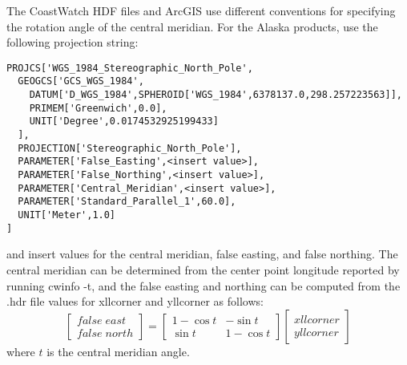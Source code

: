 The CoastWatch HDF files and ArcGIS use different conventions for
specifying the rotation angle of the central meridian.  For the Alaska
products, use the following projection string:
\begin{verbatim}
PROJCS['WGS_1984_Stereographic_North_Pole',
  GEOGCS['GCS_WGS_1984',
    DATUM['D_WGS_1984',SPHEROID['WGS_1984',6378137.0,298.257223563]],
    PRIMEM['Greenwich',0.0],
    UNIT['Degree',0.0174532925199433]
  ],
  PROJECTION['Stereographic_North_Pole'],
  PARAMETER['False_Easting',<insert value>],
  PARAMETER['False_Northing',<insert value>],
  PARAMETER['Central_Meridian',<insert value>],
  PARAMETER['Standard_Parallel_1',60.0],
  UNIT['Meter',1.0]
]
\end{verbatim}
and insert values for the central meridian, false easting, and false
northing.  The central meridian can be determined from the center
point longitude reported by running {\file cwinfo -t}, and the false
easting and northing can be computed from the {\file .hdr} file values
for {\file xllcorner} and {\file yllcorner} as follows:
\[
  \left[ \begin{array}{c}
           false\;east \\
           false\;north
         \end{array}  
  \right]
  = 
  \left[ \begin{array}{cc}
           1-\cos t & -\sin t \\
           \sin t & 1-\cos t 
         \end{array}
  \right]
  \left[ \begin{array}{c}
           xllcorner \\
           yllcorner
         \end{array}
  \right]
\]
where $t$ is the central meridian angle.
